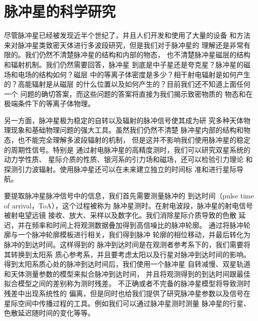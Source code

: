 \section{脉冲星的科学研究}

尽管脉冲星已经被发现近半个世纪了，并且人们开发和使用了大量的设备
和方法来对脉冲星类致密天体进行多波段研究，但是我们对于脉冲星的
理解还是非常有限的。我们仍然不清楚脉冲星的结构和内部的物态，
也不清楚脉冲星磁层的结构和辐射机制。我们仍然需要回答，脉冲星
到底是中子星还是夸克星？脉冲星的磁场和电场的结构如何？磁层
中的等离子体密度是多少？相干射电辐射是如何产生的？高能辐射是从磁层
的什么位置以及如何产生的？目前我们还不知道上面任何一个
问题的确切答案，而这些问题的答案将直接为我们揭示致密物质的
物态和在极端条件下的等离子体物理。

另一方面，脉冲星极为稳定的自转以及辐射的脉冲信号使其成为研
究多种天体物理现象和基础物理问题的强大工具。虽然我们仍然不清楚
脉冲星内部的结构和物态，也不能完全理解多波段辐射的机制，
但是这并不影响我们使用脉冲星的稳定的周期性信号。特别是
通过射电脉冲星的高精度测时，我们可以研究双星系统的动力学性质、
星际介质的性质、银河系的引力场和磁场，还可以检验引力理论
和探测引力波辐射。使用脉冲星还可以在未来建立独立的时间标
准和进行星际导航。

要提取脉冲星脉冲信号中的信息，我们首先需要测量脉冲的
到达时间（pulse time of arrival，ToA），这个过程被称为
脉冲星测时。在射电波段，脉冲星的射电信号被射电望远镜
接收、放大、采样以及数字化。我们消除星际介质导致的色散
延迟，并在频率和时间上将观测数据叠加得到高信噪比的脉冲轮廓。
通过将脉冲轮廓与一个脉冲轮廓模板进行相关，我们得到脉冲
轮廓的相位移动，并最后转化为脉冲的到达时间。这样得到的
脉冲到达时间是在观测者参考系下的，我们需要将其转换到太阳系
质心参考系，并且要考虑太阳以及行星对脉冲到达时间的影响。
得到太阳系质心处的脉冲到达时间后，我们使用一个脉冲星
自转减慢、双星轨道和天体测量参数的模型来拟合脉冲到达时间，
并且将观测得到的到达时间跟最佳拟合模型之间的差别称为测时残差。
不正确或者不完备的脉冲星模型将导致测时残差中出现系统性的
偏离，但是同时也给我们提供了研究脉冲星参数以及信号在
星际空间中传播过程的工具。例如我们可以通过脉冲星测时测量
脉冲星的行星、色散延迟随时间的变化等等。

